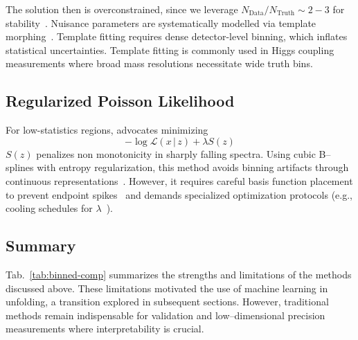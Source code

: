 The solution then is overconstrained, since we leverage \(N_{\text{Data}}/N_{\text{Truth}} \sim 2-3\) for stability~\cite{britzger_linear_2022}.
%
Nuisance parameters are systematically modelled via template morphing~\cite{baak_interpolation_2015}.
%
Template fitting requires dense detector-level binning, which inflates statistical uncertainties. Template fitting is commonly used in Higgs coupling measurements where broad mass resolutions necessitate wide truth bins.
\subsection{Regularized Poisson Likelihood}  
For low-statistics regions, \cite{gaponenko_practical_2020} advocates minimizing
\begin{equation}
     -\log \mathcal{L}(x\,|\,z) + \lambda S(z)
\end{equation}  
\(S(z)\) penalizes non monotonicity in sharply falling spectra.
%
Using cubic B--splines with entropy regularization, this method avoids binning artifacts through continuous representations~\cite{gaponenko_practical_2020}.
%
However, it requires careful basis function placement to prevent endpoint spikes~\cite{fan_analysis_2022} and demands specialized optimization protocols (e.g., cooling schedules for \(\lambda\)~\cite{jia_sparse_2019}).

    \subsection{Summary}  
        
        Tab.~\ref{tab:binned-comp} summarizes the strengths and limitations of the methods discussed above.
        These limitations motivated the use of machine learning in unfolding, a transition explored in subsequent sections.
        However, traditional methods remain indispensable for validation and low--dimensional precision measurements where interpretability is crucial.
        
